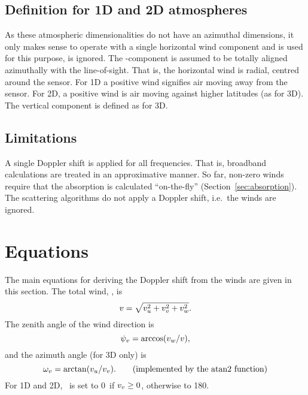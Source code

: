 \subsection{Definition for 1D and 2D atmospheres}
%
As these atmospheric dimensionalities do not have an azimuthal dimensions, it
only makes sense to operate with a single horizontal wind component and
 is used for this purpose, 
is ignored. The \WindSN-component is assumed to be totally aligned azimuthally
with the line-of-sight. That is, the horizontal wind is radial, centred around
the sensor. For 1D a positive wind signifies air moving away from the sensor.
For 2D, a positive wind is air moving against higher latitudes (as for 3D).
The vertical component is defined as for 3D.
 

\subsection{Limitations}
\label{sec:winds:limitations}
%
A single Doppler shift is applied for all frequencies. That is, broadband
calculations are treated in an approximative manner. So far, non-zero winds
require that the absorption is calculated ``on-the-fly''
(Section~\ref{sec:absorption}). The scattering algorithms do not apply a
Doppler shift, i.e.\ the winds are ignored.



\section{Equations}
\label{sec:winds:eqs}

The main equations for deriving the Doppler shift from the winds are given in
this section. The total wind, \Wind, is
\begin{equation}
  v = \sqrt{v_u^2+v_v^2+v_w^2}.
  \label{eq:winds:total}
\end{equation}
The zenith angle of the wind direction is 
\begin{equation}
  \psi_{v} = \arccos(v_w/v),
  \label{eq:winds:za}
\end{equation}
and the azimuth angle (for 3D only) is 
\begin{equation}
  \aAzmAng{\Wind} = \arctan(\WindWE/\WindSN). \qquad 
                           \mathrm{(implemented\ by\ the\ atan2\ function)}
  \label{eq:winds:aa}
\end{equation}
For 1D and 2D, \aAzmAng{\Wind}\ is set to 0\degree\ if $v_v \geq 0$,
otherwise to 180\degree. 

